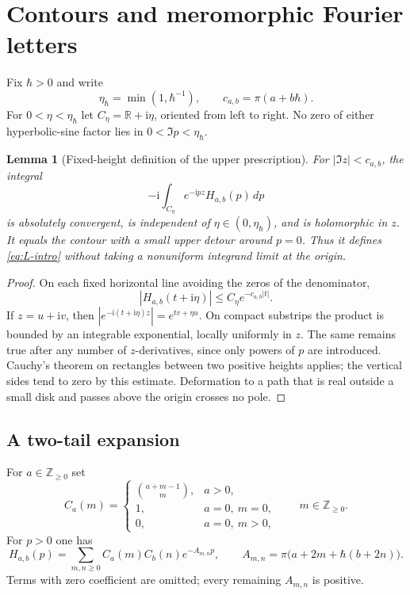 \documentclass[11pt]{article}
\numberwithin{equation}{section}
\newtheorem{lemma}[lemma]{Lemma}
\theoremstyle{definition}
\theoremstyle{remark}
\newcommand{\R}{\mathbb R}
\newcommand{\N}{\mathbb Z_{\geq0}}
\newcommand{\dd}{\,d}
\newcommand{\ii}{\mathrm i}
\newcommand{\qh}{\hbar}
\begin{document}
\section{Contours and meromorphic Fourier letters}\label{sec:contours}

Fix $\qh>0$ and write
\[
 \eta_{\qh}=\min(1,\qh^{-1}),\qquad
 c_{a,b}=\pi(a+b\qh).
\]
For $0<\eta<\eta_{\qh}$ let $C_\eta=\R+\ii\eta$, oriented from left to right.
No zero of either hyperbolic-sine factor lies in
$0<\Im p<\eta_{\qh}$.

\begin{lemma}[Fixed-height definition of the upper prescription]\label{lem:height}
For $|\Im z|<c_{a,b}$, the integral
\begin{equation}\label{eq:Lheight}
 -\ii\int_{C_\eta}e^{-\ii pz}H_{a,b}(p)\dd p
\end{equation}
is absolutely convergent, is independent of $\eta\in(0,\eta_{\qh})$, and is
holomorphic in $z$. It equals the contour with a small upper detour around
$p=0$. Thus it defines \eqref{eq:L-intro} without taking a nonuniform
integrand limit at the origin.
\end{lemma}
\begin{proof}
On each fixed horizontal line avoiding the zeros of the denominator,
\[
 |H_{a,b}(t+\ii\eta)|\leq C_\eta e^{-c_{a,b}|t|}.
\]
If $z=u+\ii v$, then
$|e^{-\ii(t+\ii\eta)z}|=e^{tv+\eta u}$.
On compact substrips the product is bounded by an integrable exponential,
locally uniformly in $z$. The same remains true after any number of
$z$-derivatives, since only powers of $p$ are introduced.
Cauchy's theorem on rectangles between two positive heights applies; the
vertical sides tend to zero by this estimate. Deformation to a path that is
real outside a small disk and passes above the origin crosses no pole.
\end{proof}

\subsection{A two-tail expansion}

For $a\in\N$ set
\begin{equation}\label{eq:Ca}
 C_a(m)=
 \begin{cases}
 \binom{a+m-1}{m},&a>0,\\
 1,&a=0,\ m=0,\\
 0,&a=0,\ m>0,
 \end{cases}
 \qquad m\in\N.
\end{equation}
For $p>0$ one has
\begin{equation}\label{eq:positiveexp}
 H_{a,b}(p)=\sum_{m,n\geq0}C_a(m)C_b(n)e^{-A_{m,n}p},\qquad
 A_{m,n}=\pi\bigl(a+2m+\qh(b+2n)\bigr).
\end{equation}
Terms with zero coefficient are omitted; every remaining $A_{m,n}$ is positive.
\end{document}
